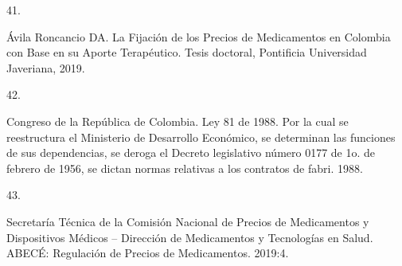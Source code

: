 \documentclass[
]{book}
\newlength{\cslhangindent}
\newlength{\csllabelwidth}
\newlength{\cslentryspacingunit} %
\newenvironment{CSLReferences}[2] %
 {%
  \setlength{\parindent}{0pt}
  \ifodd #1
  \let\oldpar\par
  \def\par{\hangindent=\cslhangindent\oldpar}
  \fi
  \setlength{\parskip}{#2\cslentryspacingunit}
 }%
 {}
\newcommand{\CSLLeftMargin}[1]{\parbox[t]{\csllabelwidth}{#1}}
\newcommand{\CSLRightInline}[1]{\parbox[t]{\linewidth - \csllabelwidth}{#1}\break}
\begin{document}
\begin{CSLReferences}{0}{0}
\leavevmode{}%
\CSLLeftMargin{41. }
\CSLRightInline{Ávila Roncancio DA. {La Fijaci{ó}n de los Precios de Medicamentos en Colombia con Base en su Aporte Terap{é}utico}. Tesis doctoral, Pontificia Universidad Javeriana, 2019.}

\leavevmode{}%
\CSLLeftMargin{42. }
\CSLRightInline{Congreso de la República de Colombia. {Ley 81 de 1988. Por la cual se reestructura el Ministerio de Desarrollo Econ{ó}mico, se determinan las funciones de sus dependencias, se deroga el Decreto legislativo n{ú}mero 0177 de 1o. de febrero de 1956, se dictan normas relativas a los contratos de fabri}. 1988.}

\leavevmode{}%
\CSLLeftMargin{43. }
\CSLRightInline{Secretaría Técnica de la Comisión Nacional de Precios de Medicamentos y Dispositivos Médicos -- Dirección de Medicamentos y Tecnologías en Salud. {ABEC{É}: Regulaci{ó}n de Precios de Medicamentos}. 2019:4.}

\end{CSLReferences}
\end{document}
